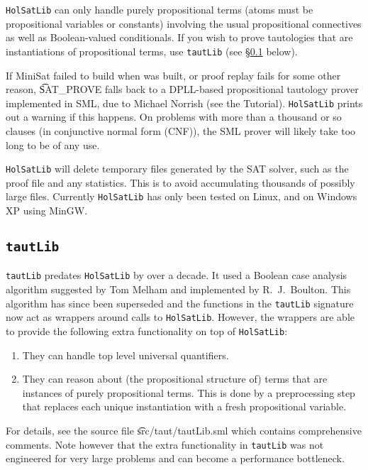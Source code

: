 {\tt{HolSatLib}} can only handle purely propositional terms (atoms must be propositional variables or constants) involving the usual propositional connectives as well as Boolean-valued conditionals. If you wish to prove tautologies that are instantiations of propositional terms, use {\tt{tautLib}} (see \S\ref{tautlib} below).

If MiniSat failed to build when \HOL{} was built, or proof replay fails for some other reason, \t{SAT\_PROVE} falls back to a DPLL-based propositional tautology prover implemented in SML, due to Michael Norrish (see the \HOL{} Tutorial). {\tt{HolSatLib}} prints out a warning if this happens. On problems with more than a thousand or so clauses (in conjunctive normal form (CNF)), the SML prover will likely take too long to be of any use.

{\tt{HolSatLib}} will delete temporary files generated by the SAT solver, such as the proof file and any statistics. This is to avoid accumulating thousands of possibly large files. Currently {\tt HolSatLib} has only been tested on Linux, and on Windows XP using MinGW.

\subsection{{\tt tautLib}}\label{tautlib}

{\tt tautLib} predates {\tt{HolSatLib}} by over a decade. It used a Boolean case analysis algorithm suggested by Tom Melham and implemented by R.~J.~Boulton. This algorithm has since been superseded and the functions in the {\tt tautLib} signature now act as wrappers around calls to {\tt{HolSatLib}}. However, the wrappers are able to provide the following extra functionality on top of {\tt{HolSatLib}}:

\begin{enumerate}
\item They can handle top level universal quantifiers.
\item They can reason about (the propositional structure of) terms that are instances of purely propositional terms. This is done by a preprocessing step that replaces each unique instantiation with a fresh propositional variable.
\end{enumerate}

For details, see the source file \t{src/taut/tautLib.sml} which contains comprehensive comments. Note however that the extra functionality in {{\tt tautLib}} was not engineered for very large problems and can become a performance bottleneck.

